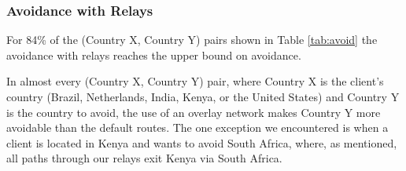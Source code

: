 

\subsubsection{Avoidance with Relays}
\begin{finding}
For 84\% of the (Country X, Country Y) pairs shown in Table \ref{tab:avoid} the avoidance with relays reaches the upper bound on avoidance. 
\end{finding}
\noindent
In almost every (Country X, Country Y) pair, where Country X is the
client's country (Brazil, Netherlands, India, Kenya, or the United
States) and Country Y is the country to avoid, the use of an overlay
network makes Country Y more avoidable than the default routes.  The one
exception we encountered is when a client is located in Kenya and wants
to avoid South Africa, where, as mentioned, all paths through our
relays exit Kenya via South Africa.

